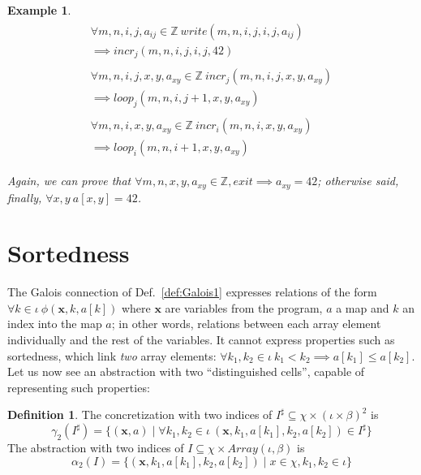 \documentclass[a4paper]{article}
\newcommand{\ve}[1]{\mathbf{#1}}
\newcommand{\vx}{\ve{x}}
\newcommand{\ZZ}{\mathbb{Z}}
\newcommand{\arraytype}[2]{\mathit{Array}\left(#1,#2\right)}
\newcommand{\abstr}[1]{#1^\sharp}
\newcommand{\abstraction}[2][]{\alpha_{#1}\left(#2\right)}
\newcommand{\concretization}[2][]{\gamma_{#1}\left(#2\right)}
\theoremstyle{definition}
\newtheorem{definition}{Definition}
\theoremstyle{plain}
\newtheorem{example}{Example}
\newcommand{\rulespacing}{\\[0.4em]}
\begin{document}
\begin{example}
{\begin{align}
\begin{aligned}
\forall m,n,i,j,a_{ij} \in \ZZ~
  \mathit{write}(m, n, i, j, i, j, a_{ij}) \\ \implies
  \mathit{incr}_j(m, n, i, j, i, j, 42)
\end{aligned}\rulespacing
\begin{aligned}
\forall m,n,i,j,x,y,a_{xy} \in \ZZ~
  \mathit{incr}_j(m, n, i, j, x, y, a_{xy}) \\ \implies
  \mathit{loop}_j(m, n, i, j+1, x, y, a_{xy})
\end{aligned}\rulespacing
\begin{aligned}
\forall m,n,i,x,y,a_{xy} \in \ZZ~
  \mathit{incr}_i(m, n, i, x, y, a_{xy}) \\ \implies
  \mathit{loop}_i(m, n, i+1, x, y, a_{xy})
\end{aligned}
\end{align}
}

Again, we can prove that $\forall m, n, x, y, a_{xy} \in \ZZ,
\mathit{exit} \implies a_{xy} = 42$; otherwise said, finally,
$\forall x,y~ a[x,y]=42$.
\end{example}


\section{Sortedness}
\label{sec:sortedness}
The Galois connection of Def.~\ref{def:Galois1} expresses relations of the form $\forall k \in \iota~ \phi(\vx, k, a[k])$ where $\vx$ are variables from the program, $a$ a map and $k$ an index into the map $a$; in other words, relations between each array element individually and the rest of the variables.
It cannot express properties such as sortedness, which link \emph{two} array elements: $\forall k_1,k_2 \in \iota~ k_1 < k_2 \implies a[k_1] \leq a[k_2]$.
Let us now see an abstraction with two ``distinguished cells'', capable of representing such properties:

\begin{definition}
The concretization with two indices of $\abstr{I} \subseteq \chi \times (\iota \times \beta)^2$ is
\begin{equation}
\concretization[2]{\abstr{I}} = \{ (\vx,a) \mid
  \forall k_1,k_2\in\iota~ (\vx,k_1,a[k_1],k_2,a[k_2]) \in \abstr{I} \}
\end{equation}
The abstraction with two indices of $I \subseteq \chi \times \arraytype{\iota}{\beta}$ is
\begin{equation}
\abstraction[2]{I} = \{ (\vx,k_1,a[k_1],k_2,a[k_2]) \mid x \in \chi, k_1,k_2 \in \iota \}
\end{equation}
\end{definition}
\end{document}
